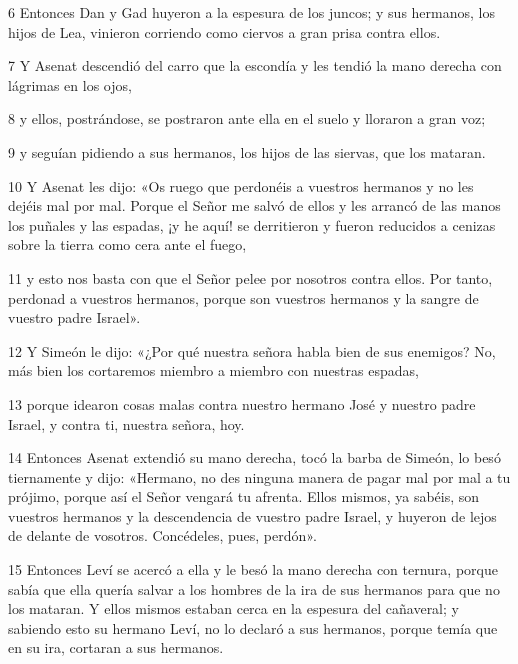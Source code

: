\par 6 Entonces Dan y Gad huyeron a la espesura de los juncos; y sus hermanos, los hijos de Lea, vinieron corriendo como ciervos a gran prisa contra ellos.

\par 7 Y Asenat descendió del carro que la escondía y les tendió la mano derecha con lágrimas en los ojos,

\par 8 y ellos, postrándose, se postraron ante ella en el suelo y lloraron a gran voz;

\par 9 y seguían pidiendo a sus hermanos, los hijos de las siervas, que los mataran.

\par 10 Y Asenat les dijo: «Os ruego que perdonéis a vuestros hermanos y no les dejéis mal por mal. Porque el Señor me salvó de ellos y les arrancó de las manos los puñales y las espadas, ¡y he aquí! se derritieron y fueron reducidos a cenizas sobre la tierra como cera ante el fuego,

\par 11 y esto nos basta con que el Señor pelee por nosotros contra ellos. Por tanto, perdonad a vuestros hermanos, porque son vuestros hermanos y la sangre de vuestro padre Israel».

\par 12 Y Simeón le dijo: «¿Por qué nuestra señora habla bien de sus enemigos? No, más bien los cortaremos miembro a miembro con nuestras espadas,

\par 13 porque idearon cosas malas contra nuestro hermano José y nuestro padre Israel, y contra ti, nuestra señora, hoy.

\par 14 Entonces Asenat extendió su mano derecha, tocó la barba de Simeón, lo besó tiernamente y dijo: «Hermano, no des ninguna manera de pagar mal por mal a tu prójimo, porque así el Señor vengará tu afrenta. Ellos mismos, ya sabéis, son vuestros hermanos y la descendencia de vuestro padre Israel, y huyeron de lejos de delante de vosotros. Concédeles, pues, perdón».

\par 15 Entonces Leví se acercó a ella y le besó la mano derecha con ternura, porque sabía que ella quería salvar a los hombres de la ira de sus hermanos para que no los mataran. Y ellos mismos estaban cerca en la espesura del cañaveral; y sabiendo esto su hermano Leví, no lo declaró a sus hermanos, porque temía que en su ira, cortaran a sus hermanos.

